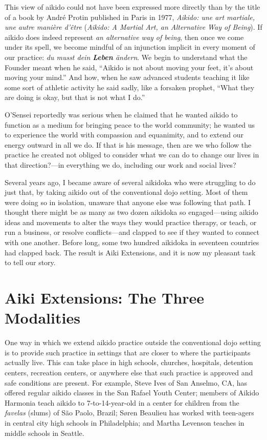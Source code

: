 This view of aikido could not have been expressed more directly than by the title of a book by Andr\'{e} Protin published in Paris in 1977, \emph{Aikido: une art martiale, une autre mani\`{e}re d'\^{e}tre} (\emph{Aikido: A Martial Art, an Alternative Way of Being}). If aikido does indeed represent \emph{an alternative way of being}, then once we come under its spell, we become mindful of an injunction implicit in every moment of our practice: \emph{du musst dein \textbf{Leben} \"{a}ndern}. We begin to understand what the Founder meant when he said, ``Aikido is not about moving your feet, it's about moving your mind.'' And how, when he saw advanced students teaching it like some sort of athletic activity he said sadly, like a forsaken prophet, ``What they are doing is okay, but that is not what I do.''

O'Sensei reportedly was serious when he claimed that he wanted aikido to function as a medium for bringing peace to the world community; he wanted us to experience the world with compassion and equanimity, and to extend our energy outward in all we do. If that is his message, then are we who follow the practice he created not obliged to consider what we can do to change our lives in that direction?---in everything we do, including our work and social lives?

Several years ago, I became aware of several aikidoka who were struggling to do just that, by taking aikido out of the conventional dojo setting. Most of them were doing so in isolation, unaware that anyone else was following that path. I thought there might be as many as two dozen aikidoka so engaged---using aikido ideas and movements to alter the ways they would practice therapy, or teach, or run a business, or resolve conflicts---and clapped to see if they wanted to connect with one another. Before long, some two hundred aikidoka in seventeen countries had clapped back. The result is Aiki Extensions, and it is now my pleasant task to tell our story.

\section*{Aiki Extensions: The Three Modalities}

One way in which we extend aikido practice outside the conventional dojo setting is to provide such practice in settings that are closer to where the participants actually live. This can take place in high schools, churches, hospitals, detention centers, recreation centers, or anywhere else that such practice is approved and safe conditions are present. For example, Steve Ives of San Anselmo, CA, has offered regular aikido classes in the San Rafael Youth Center; members of Aikido Harmonia teach aikido to 7-to-14-year-old in a center for children from the \emph{favelas} (slums) of S\~{a}o Paolo, Brazil; S\o{}ren Beaulieu has worked with teen-agers in central city high schools in Philadelphia; and Martha Levenson teaches in middle schools in Seattle. 

